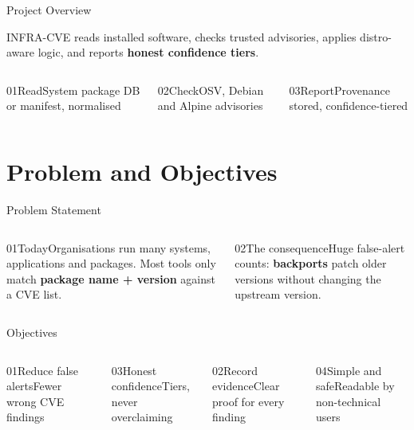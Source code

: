 \documentclass[aspectratio=169,12pt]{beamer}
\newlength{\ch}\setlength{\ch}{47mm}
\begin{document}
\begin{frame}{Project Overview}
\setlength{\ch}{27mm}
\begin{stmt}[height={19mm},height plus=30mm,fontupper=\fontsize{13}{18}\selectfont]INFRA-CVE reads installed software, checks trusted advisories, applies distro-aware logic, and reports \textbf{honest confidence tiers}.\end{stmt}\vskip2.5mm
\begin{columns}[T,onlytextwidth]
\begin{tc}{01}{Read}\normalsize System package DB or manifest, normalised\end{tc}
\begin{tcteal}{02}{Check}\normalsize OSV, Debian and Alpine advisories\end{tcteal}
\begin{tc}{03}{Report}\normalsize Provenance stored, confidence-tiered\end{tc}
\end{columns}
\end{frame}

\section{Problem and Objectives}
\begin{frame}{Problem Statement}
\setlength{\ch}{50mm}
\begin{columns}[T,onlytextwidth]
\begin{tc}{01}{Today}\normalsize Organisations run many systems, applications and packages. Most tools only match \textbf{package name + version} against a CVE list.\end{tc}
\begin{tcteal}{02}{The consequence}\normalsize Huge false-alert counts: \textbf{backports} patch older versions without changing the upstream version.\end{tcteal}
\end{columns}
\end{frame}

\begin{frame}{Objectives}
\setlength{\ch}{25mm}
\begin{columns}[T,onlytextwidth]
\begin{tc}{01}{Reduce false alerts}\normalsize Fewer wrong CVE findings\end{tc}\vskip2.5mm\begin{tc}{03}{Honest confidence}\normalsize Tiers, never overclaiming\end{tc}
\begin{tcteal}{02}{Record evidence}\normalsize Clear proof for every finding\end{tcteal}\vskip2.5mm\begin{tcteal}{04}{Simple and safe}\normalsize Readable by non-technical users\end{tcteal}
\end{columns}
\end{frame}
\end{document}
